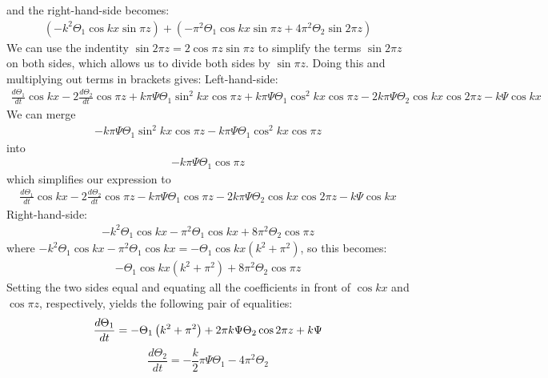 \documentclass{article}
\begin{document}
and the right-hand-side becomes:
\begin{align*}
    \left(-k^2 \Theta_1 \cos kx \sin \pi z\right) + \left(-\pi^2 \Theta_1 \cos kx \sin \pi z + 4\pi^2 \Theta_2 \sin 2\pi z\right)
\end{align*}
We can use the indentity $\sin 2 \pi z = 2\cos \pi z \sin \pi z$ to simplify the terms $\sin 2\pi z$ on both sides, which allows us to divide both sides by $\sin \pi z$. Doing this and multiplying out terms in brackets gives:
Left-hand-side:
\begin{align*}
    \frac{d\Theta_1}{dt}\cos kx - 2\frac{d\Theta_2}{dt}\cos \pi z + k\pi \Psi\Theta_1 \sin^2 kx \cos \pi z + k\pi\Psi\Theta_1 \cos^2 kx \cos \pi z - 2k\pi \Psi\Theta_2 \cos kx \cos 2\pi z - k\Psi \cos kx
\end{align*}
We can merge 
\begin{align*}
    -k \pi \Psi\Theta_1  \sin^2 kx \cos \pi z - k \pi \Psi \Theta_1  \cos^2 kx \cos \pi z
\end{align*}
into 
\begin{align*}
    -k \pi \Psi \Theta_1 \cos \pi z
\end{align*}
which simplifies our expression to
\begin{align*}
    \frac{d\Theta_1}{dt}\cos kx - 2\frac{d\Theta_2}{dt}\cos \pi z -k \pi \Psi \Theta_1 \cos \pi z - 2k\pi \Psi\Theta_2 \cos kx \cos 2\pi z - k\Psi \cos kx
\end{align*}
Right-hand-side:
\begin{align*}
    -k^2 \Theta_1 \cos kx - \pi^2 \Theta_1 \cos kx + 8\pi^2 \Theta_2 \cos \pi z
\end{align*}
where $-k^2\Theta_1 \cos kx - \pi^2 \Theta_1 \cos kx = -\Theta_1\cos kx \left(k^2 + \pi^2\right)$, so this becomes:
\begin{align*}
    -\Theta_1\cos kx \left(k^2 + \pi^2\right) + 8\pi^2 \Theta_2 \cos \pi z
\end{align*}
Setting the two sides equal and equating all the coefficients in front of $\cos kx$ and $\cos \pi z$, respectively, yields the following pair of equalities:
\begin{equation*}
    \frac{d\Theta_1}{dt} = -\Theta_1 \left(k^2 + \pi^2\right) + 2\pi k \Psi \Theta_2 \cos 2\pi z + k\Psi \\
\end{equation*}
\begin{equation*}
        \frac{d\Theta_2}{dt} = -\frac{k}{2} \pi \Psi \Theta_1 - 4\pi^2 \Theta_2 
\end{equation*}
\end{document}
